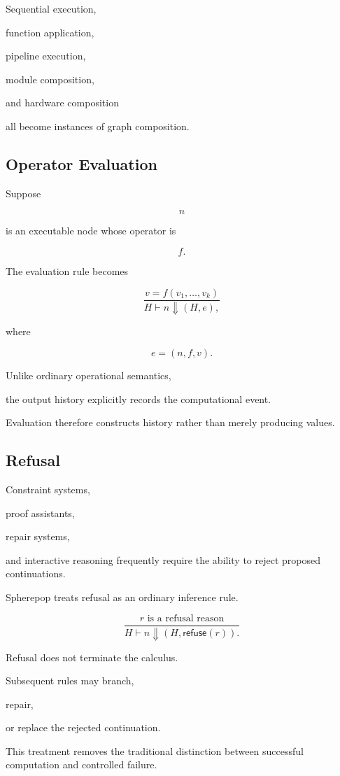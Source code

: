 \documentclass[12pt,oneside]{article}
\newcommand{\Refuse}{\mathsf{refuse}}
\begin{document}
Sequential execution,

function application,

pipeline execution,

module composition,

and hardware composition

all become instances of graph composition.

\subsection{Operator Evaluation}

Suppose

\[
n
\]

is an executable node whose operator is

\[
f.
\]

The evaluation rule becomes

\[
\frac{
v
=
f(v_1,\ldots,v_k)
}
{
H
\vdash
n
\Downarrow
(H,e),
}
\]

where

\[
e=(n,f,v).
\]

Unlike ordinary operational semantics,

the output history explicitly records the computational event.

Evaluation therefore constructs history rather than merely producing values.

\subsection{Refusal}

Constraint systems,

proof assistants,

repair systems,

and interactive reasoning frequently require the ability to reject proposed continuations.

Spherepop treats refusal as an ordinary inference rule.

\[
\frac{
r
\text{ is a refusal reason}
}
{
H
\vdash
n
\Downarrow
(H,\Refuse(r)).
}
\]

Refusal does not terminate the calculus.

Subsequent rules may branch,

repair,

or replace the rejected continuation.

This treatment removes the traditional distinction between successful computation and controlled failure.
\end{document}
